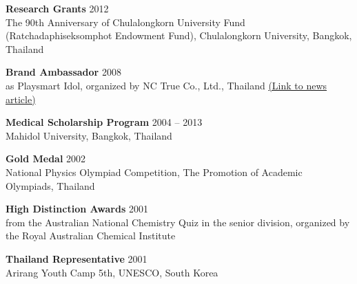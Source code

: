 \documentclass{article}
\begin{document}
\textbf{Research Grants} \hfill 2012\\
The 90th Anniversary of Chulalongkorn University Fund (Ratchadaphiseksomphot Endowment Fund), Chulalongkorn University, Bangkok, Thailand

\textbf{Brand Ambassador} \hfill 2008\\
as Playsmart Idol, organized by NC True Co., Ltd., Thailand \href{https://www.online-station.net/pc-console-game/102811/}{(Link to news article)}

\textbf{Medical Scholarship Program} \hfill 2004 -- 2013\\
Mahidol University, Bangkok, Thailand

\textbf{Gold Medal} \hfill 2002\\
National Physics Olympiad Competition, The Promotion of Academic Olympiads, Thailand

\textbf{High Distinction Awards} \hfill 2001\\
from the Australian National Chemistry Quiz in the senior division, organized by the Royal Australian Chemical Institute

\textbf{Thailand Representative} \hfill 2001\\
Arirang Youth Camp 5th, UNESCO, South Korea
\end{document}
